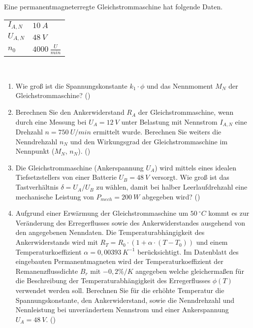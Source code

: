 \begin{question}[topic=gsm,name={14.5.2014},type=exam,tags={20140514}]
Eine permanentmagneterregte Gleichstrommaschine hat folgende Daten.\\
\begin{tabular}{L{2cm}l}
$I_{A,N}$ \dotfill &$10~A$\\
$U_{A,N}$ \dotfill & $48~V$ \\
$n_0$ \dotfill & $4000~\frac{U}{min}$
\end{tabular}\\
\begin{enumerate}
\item Wie groß ist die Spannungskonstante $k_1 \cdot \phi$ und das Nennmoment $M_N$ der Gleichstrommaschine? ()
\item Berechnen Sie den Ankerwiderstand $R_A$ der Gleichstrommaschine, wenn durch eine Messung bei $U_A = 12~V$ unter Belastung mit Nennstrom $I_{A,N}$ eine Drehzahl $n= 750~ U/min$ ermittelt wurde. Berechnen Sie weiters die Nenndrehzahl $n_N$ und den Wirkungsgrad der Gleichstrommaschine im Nennpunkt ($M_N$, $n_N$). ()
\item Die Gleichstrommaschine (Ankerspannung $U_A$) wird mittels eines idealen Tiefsetzstellers von einer Batterie $U_B = 48~V$ versorgt. Wie groß ist das Tastverhältnis $\delta = U_A / U_B$ zu wählen, damit bei halber Leerlaufdrehzahl eine mechanische Leistung von $P_{mech} = 200~W$ abgegeben wird? ()
\item Aufgrund einer Erwärmung der Gleichstrommaschine um $50~ ^\circ C$ kommt es zur Veränderung des Erregerflusses sowie des Ankerwiderstandes ausgehend von den angegebenen Nenndaten. Die Temperaturabhängigkeit des Ankerwiderstands wird mit $R_T = R_0 \cdot ( 1 + \alpha \cdot(T - T_0))$ und einem Temperaturkoeffizient $\alpha = 0,00393~ K^{-1}$ berücksichtigt. Im Datenblatt des eingebauten Permanentmagneten wird der Temperaturkoeffizient der Remanenzflussdichte $B_r$ mit $-0,2\%/K$ angegeben welche gleichermaßen für die Beschreibung der Temperaturabhängigkeit des Erregerflusses $\phi(T)$ verwendet werden soll. Berechnen Sie für die erhöhte Temperatur die Spannungskonstante, den Ankerwiderstand, sowie die Nenndrehzahl und Nennleistung bei unverändertem Nennstrom und einer Ankerspannung $U_A = 48~V$. ()
\end{enumerate}
\end{question}
